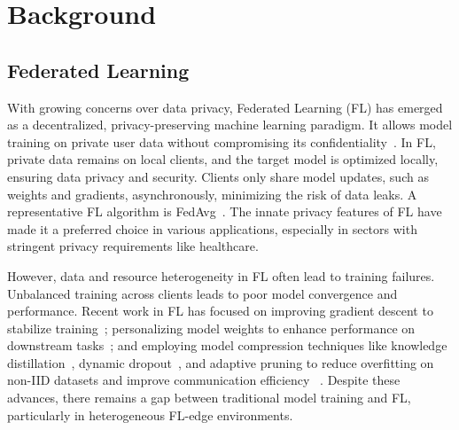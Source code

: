 \section{Background}
\subsection{Federated Learning}
With growing concerns over data privacy, Federated Learning (FL) has emerged as a decentralized, privacy-preserving machine learning paradigm. It allows model training on private user data without compromising its confidentiality~\citep{mcmahan2017fedavg}. 
In FL, private data remains on local clients, and the target model is optimized locally, ensuring data privacy and security. Clients only share model updates, such as weights and gradients, asynchronously, minimizing the risk of data leaks.
A representative FL algorithm is FedAvg~\citep{mcmahan2017fedavg}. The innate privacy features of FL have made it a preferred choice in various applications, especially in sectors with stringent privacy requirements like healthcare.


However, data and resource heterogeneity in FL often lead to training failures. Unbalanced training across clients leads to poor model convergence and performance. Recent work in FL has focused on improving gradient descent to stabilize training~\citep{liu2020momentum_fl,karimireddy2020scaffold,li2020fedprox}; personalizing model weights to enhance performance on downstream tasks~\citep{deng2020adaptive_pfl,tan2022personalizedfl,yu2022rafl}; and employing model compression techniques like knowledge distillation~\citep{yu2022kdfl}, dynamic dropout~\citep{yu2021feddp}, and adaptive pruning to reduce overfitting on non-IID datasets and improve communication efficiency ~\citep{jiang2022pruneFL,yu2021feddp,lin2020feddf,yu2022spatl}.
Despite these advances, there remains a gap between traditional model training and FL, particularly in heterogeneous FL-edge environments.




